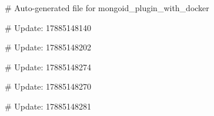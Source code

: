 # Auto-generated file for mongoid_plugin_with_docker

# Update: 17885148140

# Update: 17885148202

# Update: 17885148274

# Update: 17885148270

# Update: 17885148281
